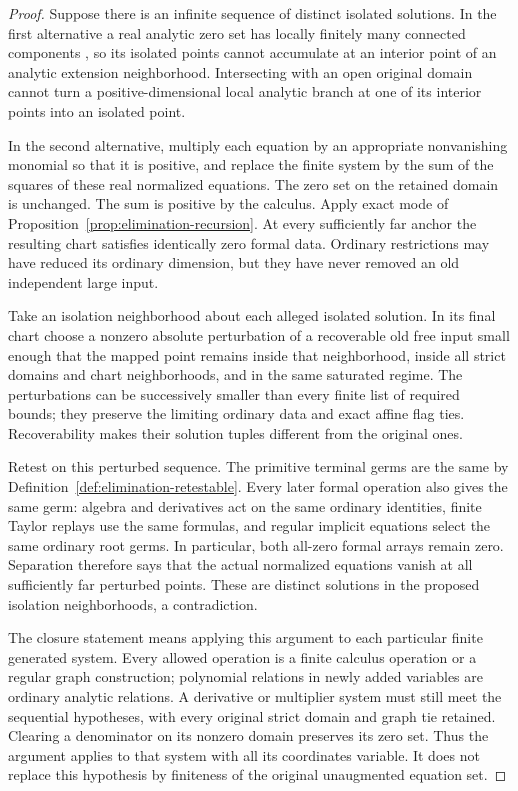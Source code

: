 \begin{proof}
Suppose there is an infinite sequence of distinct isolated solutions.
In the first alternative a real analytic zero set has locally finitely
many connected components \cite[Corollary~2.7]{BierstoneMilman1988},
so its isolated points cannot accumulate at an interior point of an
analytic extension neighborhood.  Intersecting with an open original
domain cannot turn
a positive-dimensional local analytic branch at one of its interior
points into an isolated point.

In the second alternative, multiply each equation by an appropriate
nonvanishing monomial so that it is positive, and replace the finite
system by the sum of the squares of these real normalized equations.
The zero set on the retained domain is unchanged.  The sum is
positive by the calculus.  Apply exact mode of
Proposition~\ref{prop:elimination-recursion}.  At every sufficiently
far anchor the resulting chart satisfies identically zero formal
data.  Ordinary restrictions may have reduced its ordinary dimension,
but they have never removed an old independent large input.

Take an isolation neighborhood about each alleged isolated solution.
In its final chart choose a nonzero absolute perturbation of a
recoverable old free input small enough that the mapped point remains
inside that neighborhood, inside all strict domains and chart
neighborhoods, and in the same saturated regime.  The perturbations
can be successively smaller than every finite list of required
bounds; they preserve the limiting ordinary data and exact affine
flag ties.  Recoverability makes their solution tuples different
from the original ones.

Retest on this perturbed sequence.  The primitive terminal germs are
the same by Definition~\ref{def:elimination-retestable}.  Every later
formal operation also gives the same germ: algebra and derivatives
act on the same ordinary identities, finite Taylor replays use the
same formulas, and regular implicit equations select the same
ordinary root germs.  In particular, both all-zero formal arrays
remain zero.  Separation therefore says that the actual normalized
equations vanish at all sufficiently far perturbed points.  These
are distinct solutions in the proposed isolation neighborhoods, a
contradiction.

The closure statement means applying this argument to each particular
finite generated system.  Every allowed operation is a finite
calculus operation or a regular graph construction; polynomial
relations in newly added variables are ordinary analytic relations.
A derivative or multiplier system must still meet the sequential
hypotheses, with every original strict domain and graph tie retained.
Clearing a denominator on its nonzero domain preserves its zero set.
Thus the argument applies to that system with all its coordinates
variable.  It does not replace this hypothesis by finiteness of the
original unaugmented equation set.
\end{proof}


